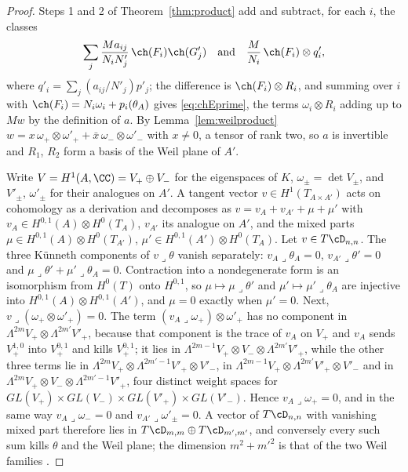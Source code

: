 \begin{proof}
Steps 1 and 2 of Theorem~\ref{thm:product} add and subtract, for each $i$, the classes
\[
\sum_{j}\frac{Ma_{ij}}{N_{i}N'_{j}}\,\ch(F_{i})\ch(G'_{j})\quad\text{and}\quad\frac{M}{N_{i}}\,\ch(F_{i})\otimes q'_{i},
\]
where $q'_{i}=\sum_{j}(a_{ij}/N'_{j})p'_{j}$; the difference is $\ch(F_{i})\otimes R_{i}$, and summing over $i$ with $\ch(F_{i})=N_{i}\omega_{i}+p_{i}(\theta_{A})$ gives \eqref{eq:chEprime}, the terms $\omega_{i}\otimes R_{i}$ adding up to $Mw$ by the definition of $a$. By Lemma~\ref{lem:weilproduct} $w=x\,\omega_{+}\otimes\omega'_{+}+\bar x\,\omega_{-}\otimes\omega'_{-}$ with $x\ne0$, a tensor of rank two, so $a$ is invertible and $R_{1}$, $R_{2}$ form a basis of the Weil plane of $A'$.

Write $V=H^{1}(A,\CC)=V_{+}\oplus V_{-}$ for the eigenspaces of $K$, $\omega_{\pm}=\det V_{\pm}$, and $V'_{\pm}$, $\omega'_{\pm}$ for their analogues on $A'$. A tangent vector $v\in H^{1}(T_{A\times A'})$ acts on cohomology as a derivation and decomposes as $v=v_{A}+v_{A'}+\mu+\mu'$ with $v_{A}\in H^{0,1}(A)\otimes H^{0}(T_{A})$, $v_{A'}$ its analogue on $A'$, and the mixed parts $\mu\in H^{0,1}(A)\otimes H^{0}(T_{A'})$, $\mu'\in H^{0,1}(A')\otimes H^{0}(T_{A})$. Let $v\in T\cD_{n,n}$. The three K\"unneth components of $v\lrcorner\theta$ vanish separately: $v_{A}\lrcorner\theta_{A}=0$, $v_{A'}\lrcorner\theta'=0$ and $\mu\lrcorner\theta'+\mu'\lrcorner\theta_{A}=0$. Contraction into a nondegenerate form is an isomorphism from $H^{0}(T)$ onto $H^{0,1}$, so $\mu\mapsto\mu\lrcorner\theta'$ and $\mu'\mapsto\mu'\lrcorner\theta_{A}$ are injective into $H^{0,1}(A)\otimes H^{0,1}(A')$, and $\mu=0$ exactly when $\mu'=0$. Next, $v\lrcorner(\omega_{+}\otimes\omega'_{+})=0$. The term $(v_{A}\lrcorner\omega_{+})\otimes\omega'_{+}$ has no component in $\Lambda^{2m}V_{+}\otimes\Lambda^{2m'}V'_{+}$, because that component is the trace of $v_{A}$ on $V_{+}$ and $v_{A}$ sends $V_{+}^{1,0}$ into $V_{+}^{0,1}$ and kills $V_{+}^{0,1}$; it lies in $\Lambda^{2m-1}V_{+}\otimes V_{-}\otimes\Lambda^{2m'}V'_{+}$, while the other three terms lie in $\Lambda^{2m}V_{+}\otimes\Lambda^{2m'-1}V'_{+}\otimes V'_{-}$, in $\Lambda^{2m-1}V_{+}\otimes\Lambda^{2m'}V'_{+}\otimes V'_{-}$ and in $\Lambda^{2m}V_{+}\otimes V_{-}\otimes\Lambda^{2m'-1}V'_{+}$, four distinct weight spaces for $GL(V_{+})\times GL(V_{-})\times GL(V'_{+})\times GL(V'_{-})$. Hence $v_{A}\lrcorner\omega_{+}=0$, and in the same way $v_{A}\lrcorner\omega_{-}=0$ and $v_{A'}\lrcorner\omega'_{\pm}=0$. A vector of $T\cD_{n,n}$ with vanishing mixed part therefore lies in $T\cD_{m,m}\oplus T\cD_{m',m'}$, and conversely every such sum kills $\theta$ and the Weil plane; the dimension $m^{2}+m'^{2}$ is that of the two Weil families \cite{Weil77}.


\end{proof}
